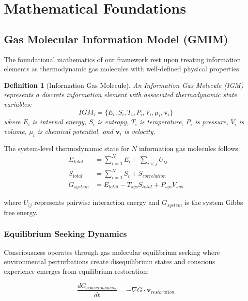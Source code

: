 \documentclass[12pt,a4paper]{article}
\newtheorem{definition}{Definition}
\begin{document}
\section{Mathematical Foundations}

\subsection{Gas Molecular Information Model (GMIM)}

The foundational mathematics of our framework rest upon treating information elements as thermodynamic gas molecules with well-defined physical properties.

\begin{definition}[Information Gas Molecule]
An Information Gas Molecule (IGM) represents a discrete information element with associated thermodynamic state variables:
\begin{equation}
IGM_i = \{E_i, S_i, T_i, P_i, V_i, \mu_i, \mathbf{v}_i\}
\end{equation}
where $E_i$ is internal energy, $S_i$ is entropy, $T_i$ is temperature, $P_i$ is pressure, $V_i$ is volume, $\mu_i$ is chemical potential, and $\mathbf{v}_i$ is velocity.
\end{definition}

The system-level thermodynamic state for $N$ information gas molecules follows:
\begin{align}
E_{total} &= \sum_{i=1}^{N} E_i + \sum_{i<j} U_{ij} \\
S_{total} &= \sum_{i=1}^{N} S_i + S_{correlation} \\
G_{system} &= E_{total} - T_{sys} S_{total} + P_{sys} V_{sys}
\end{align}

where $U_{ij}$ represents pairwise interaction energy and $G_{system}$ is the system Gibbs free energy.

\subsubsection{Equilibrium Seeking Dynamics}

Consciousness operates through gas molecular equilibrium seeking where environmental perturbations create disequilibrium states and conscious experience emerges from equilibrium restoration:

\begin{equation}
\frac{dG_{consciousness}}{dt} = -\nabla G \cdot \mathbf{v}_{restoration}
\end{equation}
\end{document}
